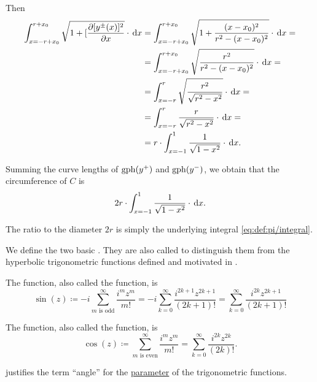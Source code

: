 \begin{defproof}
  Then
  \begin{align*}
    \int_{x=-r + x_0}^{r + x_0} \sqrt{ 1 + [\diffp {[y^\pm(x)]^2} x } \cdot \dl x
    &=
    \int_{x=-r + x_0}^{r + x_0} \sqrt{ 1 + \frac {(x - x_0)^2} { r^2 - (x - x_0)^2 } } \cdot \dl x
    = \\ &=
    \int_{x=-r + x_0}^{r + x_0} \sqrt{ \frac {r^2} { r^2 - (x - x_0)^2 } } \cdot \dl x
    = \\ &=
    \int_{x=-r}^r \sqrt{ \frac {r^2} { \sqrt{r^2 - x^2} } } \cdot \dl x
    = \\ &=
    \int_{x=-r}^r \frac r { \sqrt{r^2 - x^2} } \cdot \dl x
    = \\ &=
    r \cdot \int_{x=-1}^1 \frac 1 { \sqrt{1 - x^2} } \cdot \dl x.
  \end{align*}

  Summing the curve lengths of \( \operatorname{gph}(y^+) \) and \( \operatorname{gph}(y^-) \), we obtain that the circumference of \( C \) is
  \begin{equation*}
    2r \cdot \int_{x=-1}^1 \frac 1 { \sqrt{1 - x^2} } \cdot \dl x.
  \end{equation*}

  The ratio to the diameter \( 2r \) is simply the underlying integral \eqref{eq:def:pi/integral}.
\end{defproof}

\begin{definition}\label{def:trigonometric_functions}
  We define the two basic . They are also called  to distinguish them from the hyperbolic trigonometric functions defined and motivated in .

  \begin{thmenum}
     The  function, also called the  function, is
    \begin{equation*}
      \sin(z)
      \coloneqq
      -i \sum_{m \text{ is odd}}^\infty \frac {i^m z^m} {m!}
      =
      -i \sum_{k=0}^\infty \frac {i^{2k+1} z^{2k+1}} {(2k + 1)!}
      =
      \sum_{k=0}^\infty \frac {i^{2k} z^{2k+1}} {(2k + 1)!}
    \end{equation*}

     The  function, also called the  function, is
    \begin{equation*}
      \cos(z)
      \coloneqq
      \sum_{m \text{ is even}}^\infty \frac {i^m z^m} {m!}
      =
      \sum_{k=0}^\infty \frac {i^{2k} z^{2k}} {(2k)!}.
    \end{equation*}
  \end{thmenum}

   justifies the term \enquote{angle} for the \hyperref[con:function_arguments]{parameter} of the trigonometric functions.
\end{definition}


